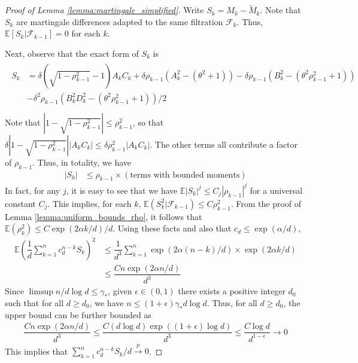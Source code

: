 \documentclass[12pt]{article}
\def\gF{{\mathcal{F}}}
\newcommand{\E}{\mathbb{E}}
\begin{document}
\begin{proof}[Proof of Lemma \ref{lemma:martingale_simplified}]
    Write $S_k=M_k-\tilde M_k$. Note that $S_k$ are martingale differences adapted to the same filtration $\gF_k$. Thus, $\E[S_k|\gF_{k-1}]=0$ for each $k$.

    Next, observe that the exact form of $S_k$ is
    \begin{align*}
     \begin{split}
    S_k &= \delta\left(\sqrt{1-\rho^2_{k-1}}-1\right)A_kC_k+\delta\rho_{k-1}(A_k^2-(\theta^2+1))-\delta\rho_{k-1}(B_k^2-(\theta^2\rho_{k-1}^2+1))\\
    &-\delta^2\rho_{k-1}(B_k^2D_k^2-(\theta^2\rho_{k-1}^2+1))/2\\
\end{split}
    \end{align*}
    Note that $|1-\sqrt{1-\rho^2_{k-1}}|\leq \rho^2_{k-1}$, so that $\delta|1-\sqrt{1-\rho^2_{k-1}}||A_kC_k|\leq \delta\rho_{k-1}^2|A_kC_k|$. The other terms all contribute a factor of $\rho_{k-1}$. Thus, in totality, we have
    \begin{align}\label{ineq:Sk_bound}
        |S_k| &\leq \rho_{k-1}\times(\text{terms with bounded moments})
    \end{align}
   In fact, for any $j$, it is easy to see that we have $\E|S_k|^j\leq C_j|\rho_{k-1}|^j$ for a universal constant $C_j$. This implies, for each $k$, $\E(S_k^2|\gF_{k-1})\leq C\rho^2_{k-1}$. From the proof of Lemma \ref{lemma:uniform_bounds_rho}, it follows that $\E(\rho_k^2)\leq C\exp(2\alpha k/d)/d$. Using these facts and also that $c_d\leq \exp(\alpha/d)$,
    \begin{align*}
        \E\left(\dfrac{1}{d}\sum_{k=1}^nc_d^{n-k}S_k\right)^2 &\leq \dfrac{1}{d^3}\sum_{k=1}^n \exp(2\alpha (n-k)/d)\times \exp(2\alpha k/d)\\
        &\leq \dfrac{Cn\exp(2\alpha n/d)}{d^3}
    \end{align*}Since $\limsup n/d\log d\leq \gamma_*$, given $\epsilon\in(0,1)$ there exists a positive integer $d_0$ such that for all $d\geq d_0$, we have $n\leq (1+\epsilon)\gamma_*d\log d$. Thus, for all $d\geq d_0$, the upper bound can be further bounded as
    \begin{align*}
        \dfrac{Cn\exp(2\alpha n/d)}{d^3}\leq \dfrac{C(d\log d)\exp((1+\epsilon)\log d)}{d^3}\leq \dfrac{C\log d}{d^{1-\epsilon}}\to 0
    \end{align*}This implies that $\sum_{k=1}^n c_d^{n-k}S_k/d\stackrel{p}{\to}0$.
\end{proof}
\end{document}
